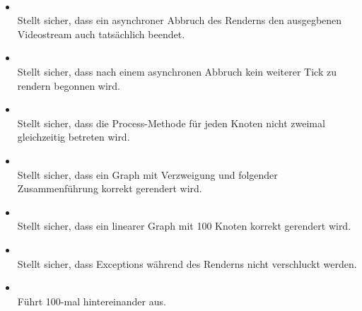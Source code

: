 \paragraph{}
\begin{itemize}
	\item {} \\
	Stellt sicher, dass ein asynchroner Abbruch des Renderns den ausgegbenen Videostream auch tatsächlich beendet.
    \item {} \\
    Stellt sicher, dass nach einem asynchronen Abbruch kein weiterer Tick zu rendern begonnen wird.
    \item {} \\
    Stellt sicher, dass die Process-Methode für jeden Knoten nicht zweimal gleichzeitig betreten wird.
    \item {} \\
    Stellt sicher, dass ein Graph mit Verzweigung und folgender Zusammenführung korrekt gerendert wird.
    \item {} \\
    Stellt sicher, dass ein linearer Graph mit 100 Knoten korrekt gerendert wird.
    \item {} \\
    Stellt sicher, dass Exceptions während des Renderns nicht verschluckt werden.
    \item {} \\
    Führt  100-mal hintereinander aus.
\end{itemize}

\paragraph{}

